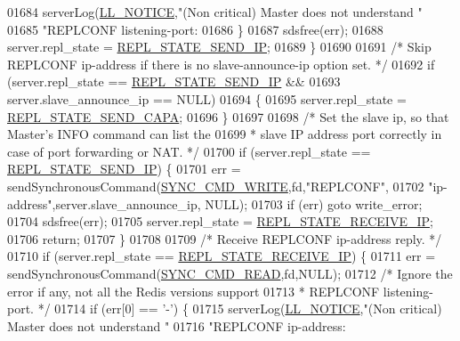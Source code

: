 \begin{DoxyCode}
{{{{{{{{{{{{{{{{{{{{{{{{{{{{{{{{{{{{{{{{{{{{{{{{{{{{{{{{{{{{{01684             serverLog(\hyperlink{server_8h_a8c54c191e436c7dd3012167212692401}{LL\_NOTICE},\textcolor{stringliteral}{"(Non critical) Master does not understand "}
01685                                 \textcolor{stringliteral}{"REPLCONF listening-port: %
01686         \}
01687         sdsfree(err);
01688         server.repl\_state = \hyperlink{server_8h_a76e12a8d873ec0cfb646bcf60ea3a8b9}{REPL\_STATE\_SEND\_IP};
01689     \}
01690 
01691     \textcolor{comment}{/* Skip REPLCONF ip-address if there is no slave-announce-ip option set. */}
01692     \textcolor{keywordflow}{if} (server.repl\_state == \hyperlink{server_8h_a76e12a8d873ec0cfb646bcf60ea3a8b9}{REPL\_STATE\_SEND\_IP} &&
01693         server.slave\_announce\_ip == NULL)
01694     \{
01695             server.repl\_state = \hyperlink{server_8h_a9933a133c5a09bdaa0a35a8152826ea3}{REPL\_STATE\_SEND\_CAPA};
01696     \}
01697 
01698     \textcolor{comment}{/* Set the slave ip, so that Master's INFO command can list the}
01699 \textcolor{comment}{     * slave IP address port correctly in case of port forwarding or NAT. */}
01700     \textcolor{keywordflow}{if} (server.repl\_state == \hyperlink{server_8h_a76e12a8d873ec0cfb646bcf60ea3a8b9}{REPL\_STATE\_SEND\_IP}) \{
01701         err = sendSynchronousCommand(\hyperlink{replication_8c_aa4480c458f209657b59d476157d44aab}{SYNC\_CMD\_WRITE},fd,\textcolor{stringliteral}{"REPLCONF"},
01702                 \textcolor{stringliteral}{"ip-address"},server.slave\_announce\_ip, NULL);
01703         \textcolor{keywordflow}{if} (err) \textcolor{keywordflow}{goto} write\_error;
01704         sdsfree(err);
01705         server.repl\_state = \hyperlink{server_8h_a41b2bc439b62dfa5cc310aa95cca90da}{REPL\_STATE\_RECEIVE\_IP};
01706         \textcolor{keywordflow}{return};
01707     \}
01708 
01709     \textcolor{comment}{/* Receive REPLCONF ip-address reply. */}
01710     \textcolor{keywordflow}{if} (server.repl\_state == \hyperlink{server_8h_a41b2bc439b62dfa5cc310aa95cca90da}{REPL\_STATE\_RECEIVE\_IP}) \{
01711         err = sendSynchronousCommand(\hyperlink{replication_8c_a5dde0948d622fc1b0327b0d49cb3cef5}{SYNC\_CMD\_READ},fd,NULL);
01712         \textcolor{comment}{/* Ignore the error if any, not all the Redis versions support}
01713 \textcolor{comment}{         * REPLCONF listening-port. */}
01714         \textcolor{keywordflow}{if} (err[0] == \textcolor{stringliteral}{'-'}) \{
01715             serverLog(\hyperlink{server_8h_a8c54c191e436c7dd3012167212692401}{LL\_NOTICE},\textcolor{stringliteral}{"(Non critical) Master does not understand "}
01716                                 \textcolor{stringliteral}{"REPLCONF ip-address: %
}}}}}}}}}}}}}}}}}}}}}}}}}}}}}}}}}}}}}}}}}}}}}}}}}}}}}}}}}}}}}}}
\end{DoxyCode}
